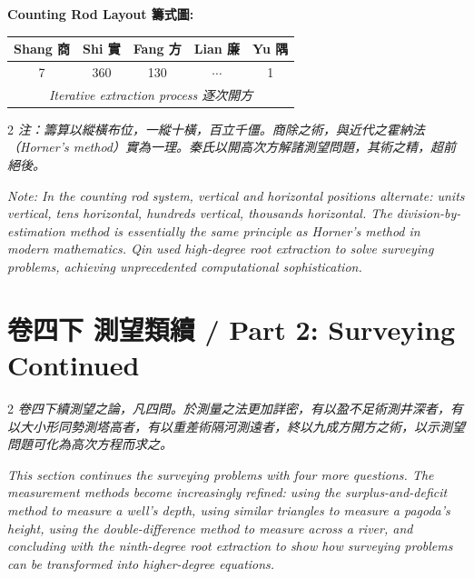 \documentclass[11pt,a4paper]{article}
\begin{document}
\vspace{0.5em}

\noindent\textbf{Counting Rod Layout 籌式圖:}
\begin{center}
\begin{tabular}{|c|c|c|c|c|}
\hline
\textbf{Shang 商} & \textbf{Shi 實} & \textbf{Fang 方} & \textbf{Lian 廉} & \textbf{Yu 隅} \\
\hline
7 & 360 & 130 & $\cdots$ & 1 \\
\hline
\multicolumn{5}{|c|}{\textit{Iterative extraction process 逐次開方}} \\
\hline
\end{tabular}
\end{center}

\begin{paracol}{2}
\switchcolumn[0]
\noindent\textit{注：籌算以縱橫布位，一縱十橫，百立千僵。商除之術，與近代之霍納法（Horner's method）實為一理。秦氏以開高次方解諸測望問題，其術之精，超前絕後。}

\switchcolumn[1]
\noindent\textit{Note: In the counting rod system, vertical and horizontal positions alternate: units vertical, tens horizontal, hundreds vertical, thousands horizontal. The division-by-estimation method is essentially the same principle as Horner's method in modern mathematics. Qin used high-degree root extraction to solve surveying problems, achieving unprecedented computational sophistication.}
\end{paracol}

\newpage

\section{卷四下 測望類續 / Part 2: Surveying Continued}
\label{sec:juan4xia}

\begin{paracol}{2}
\switchcolumn[0]
\noindent\textit{\color{notecolor}卷四下續測望之論，凡四問。於測量之法更加詳密，有以盈不足術測井深者，有以大小形同勢測塔高者，有以重差術隔河測遠者，終以九成方開方之術，以示測望問題可化為高次方程而求之。}

\switchcolumn[1]
\noindent\textit{\color{notecolor}This section continues the surveying problems with four more questions. The measurement methods become increasingly refined: using the surplus-and-deficit method to measure a well's depth, using similar triangles to measure a pagoda's height, using the double-difference method to measure across a river, and concluding with the ninth-degree root extraction to show how surveying problems can be transformed into higher-degree equations.}
\end{paracol}
\end{document}
